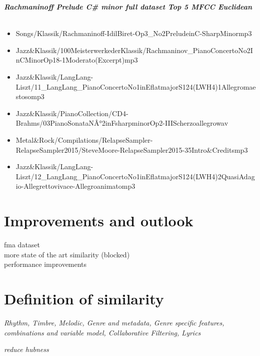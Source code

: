 \textit{\textbf{Rachmaninoff Prelude C\# minor full dataset Top 5 MFCC Euclidean\\}}
\\
\begin{itemize}
\item Songs/Klassik/Rachmaninoff-IdilBiret-Op3\_No2PreludeinC-SharpMinormp3
\item Jazz\&Klassik/100MeisterwerkederKlassik/Rachmaninov\_PianoConcertoNo2InCMinorOp18-1Moderato(Excerpt)mp3
\item Jazz\&Klassik/LangLang-Liszt/11\_LangLang\_PianoConcertoNo1inEflatmajorS124(LWH4)1Allegromaestosomp3
\item Jazz\&Klassik/PianoCollection/CD4-Brahms/03PianoSonataNÂ°2inFsharpminorOp2-IIIScherzoallegrowav
\item Metal\&Rock/Compilations/RelapseSampler-RelapseSampler2015/SteveMoore-RelapseSampler2015-35Intro\&Creditsmp3
\item Jazz\&Klassik/LangLang-Liszt/12\_LangLang\_PianoConcertoNo1inEflatmajorS124(LWH4)2QuasiAdagio-Allegrettovivace-Allegroanimatomp3
\end{itemize}

\section{Improvements and outlook}

fma dataset\\
more state of the art similarity (blocked)\\
performance improvements\\

\section{Definition of similarity}
\textit{Rhythm, Timbre, Melodic, Genre and metadata, Genre specific features, combinations and variable model, Collaborative Filtering, Lyrics}

\textit{reduce hubness}

